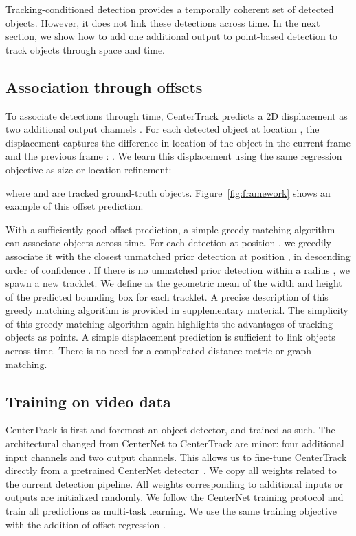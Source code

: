 \documentclass[runningheads]{llncs}
\newcommand{\lblsec}[1]{\label{sec:#1}}
\newcommand{\reffig}[1]{Figure~\ref{fig:#1}}
\begin{document}
Tracking-conditioned detection provides a temporally coherent set of detected objects.
However, it does not link these detections across time.
In the next section, we show how to add one additional output to point-based detection to track objects through space and time.


\subsection{Association through offsets}
\lblsec{offset}
To associate detections through time, CenterTrack predicts a 2D displacement as two additional output channels .
For each detected object at location , the displacement  captures the difference in location of the object in the current frame  and the previous frame : .
We learn this displacement using the same regression objective as size or location refinement:

where  and  are tracked ground-truth objects.
\reffig{framework} shows an example of this offset prediction.

With a sufficiently good offset prediction, a simple greedy matching algorithm can associate objects across time.
For each detection at position , we greedily associate it with the closest unmatched prior detection at position , in descending order of confidence .
If there is no unmatched prior detection within a radius , we spawn a new tracklet.
We define  as the geometric mean of the width and height of the predicted bounding box for each tracklet.
A precise description of this greedy matching algorithm is provided in supplementary material.
The simplicity of this greedy matching algorithm again highlights the advantages of tracking objects as points.
A simple displacement prediction is sufficient to link objects across time.
There is no need for a complicated distance metric or graph matching.



\subsection{Training on video data}
\lblsec{train_video}

CenterTrack is first and foremost an object detector, and trained as such.
The architectural changed from CenterNet to CenterTrack are minor: four additional input channels and two output channels.
This allows us to fine-tune CenterTrack directly from a pretrained CenterNet detector~\cite{zhou2019objects}.
We copy all weights related to the current detection pipeline. All weights corresponding to additional inputs or outputs are initialized randomly.
We follow the CenterNet training protocol and train all predictions as multi-task learning.
We use the same training objective with the addition of offset regression .
\end{document}
